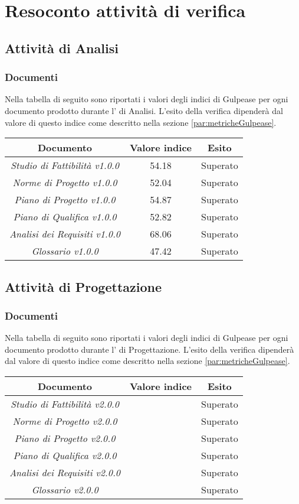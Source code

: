 \documentclass{scalatekids-article}
\begin{document}
\section{Resoconto attività di verifica}
\label{sec:resAttivitaVerifica}
\subsection{Attività di Analisi}
\subsubsection{Documenti}
Nella tabella di seguito sono riportati i valori degli indici di Gulpease per ogni documento prodotto durante l' di Analisi. L'esito della verifica dipenderà dal valore di questo indice come descritto nella sezione \ref{par:metricheGulpease}.
\begin{center}
  \begin{tabular}{| c | c | c |}
    \hline
    Documento & Valore indice & Esito\\
    \hline
    \textit{Studio di Fattibilità v1.0.0} & 54.18 & Superato\\
    \textit{Norme di Progetto v1.0.0} & 52.04 & Superato\\
    \textit{Piano di Progetto v1.0.0} & 54.87 & Superato\\
    \textit{Piano di Qualifica v1.0.0} & 52.82 & Superato\\
    \textit{Analisi dei Requisiti v1.0.0} & 68.06 & Superato\\
    \textit{Glossario v1.0.0} & 47.42 & Superato\\
    \hline
  \end{tabular}
\end{center}
\subsection{Attività di Progettazione}
\subsubsection{Documenti}
Nella tabella di seguito sono riportati i valori degli indici di Gulpease per ogni documento prodotto durante l' di Progettazione. L'esito della verifica dipenderà dal valore di questo indice come descritto nella sezione \ref{par:metricheGulpease}.
\begin{center}
  \begin{tabular}{| c | c | c |}
    \hline
    Documento & Valore indice & Esito\\
    \hline
    \textit{Studio di Fattibilità v2.0.0} &  & Superato\\
    \textit{Norme di Progetto v2.0.0} &  & Superato\\
    \textit{Piano di Progetto v2.0.0} &  & Superato\\
    \textit{Piano di Qualifica v2.0.0} &  & Superato\\
    \textit{Analisi dei Requisiti v2.0.0} &  & Superato\\
    \textit{Glossario v2.0.0} &  & Superato\\
    \hline
  \end{tabular}
\end{center}
\newpage
\end{document}
